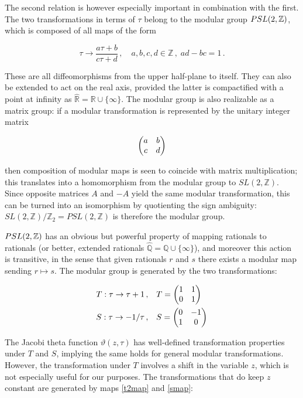 \documentclass{article}
\begin{document}
The second relation is however especially important in combination with the first. The two transformations in terms of $\tau$ belong to the modular group $PSL(2,\mathbb{Z})$, which is composed of all maps of the form

\begin{equation}
    \tau \rightarrow \frac{a \tau + b}{c\tau + d}\,, \quad a,b,c,d \in \mathbb{Z}\,,\; ad - bc = 1\,.
\end{equation}

These are all diffeomorphisms from the upper half-plane to itself. They can also be extended to act on the real axis, provided the latter is compactified with a point at infinity as $\hat{\mathbb{R}} = \mathbb{R} \cup \{\infty\}$. The modular group is also realizable as a matrix group: if a modular transformation is represented by the unitary integer matrix

\begin{equation}
    \mqty( a & b \\ c & d)
\end{equation}

then composition of modular maps is seen to coincide with matrix multiplication; this translates into a homomorphism from the modular group to $SL(2,\mathbb{Z})$. Since opposite matrices $A$ and $-A$ yield the same modular transformation, this can be turned into an isomorphism by quotienting the sign ambiguity: $SL(2,\mathbb{Z})/\mathbb{Z}_2 = PSL(2,\mathbb{Z})$ is therefore the modular group.

$PSL(2,\mathbb{Z})$ has an obvious but powerful property of mapping rationals to rationals (or better, extended rationals $\hat{\mathbb{Q}} = \mathbb{Q} \cup \{\infty\}$), and moreover this action is transitive, in the sense that given rationals $r$ and $s$ there exists a modular map sending $r\mapsto s$. The modular group is generated by the two transformations:

\begin{align}
   && T : \tau \rightarrow \tau + 1\,, \quad& T=\mqty(1 & 1 \\ 0 & 1) && \\
   && S : \tau \rightarrow -1/\tau\,, \quad& S=\mqty(0 & -1 \\ 1 & 0) &&
\end{align}

The Jacobi theta function $\vartheta(z,\tau)$ has well-defined transformation properties under $T$ and $S$, implying the same holds for general modular transformations. However, the transformation under $T$ involves a shift in the variable $z$, which is not especially useful for our purposes. The transformations that do keep $z$ constant are generated by maps \eqref{t2map} and \eqref{smap}:
\end{document}
